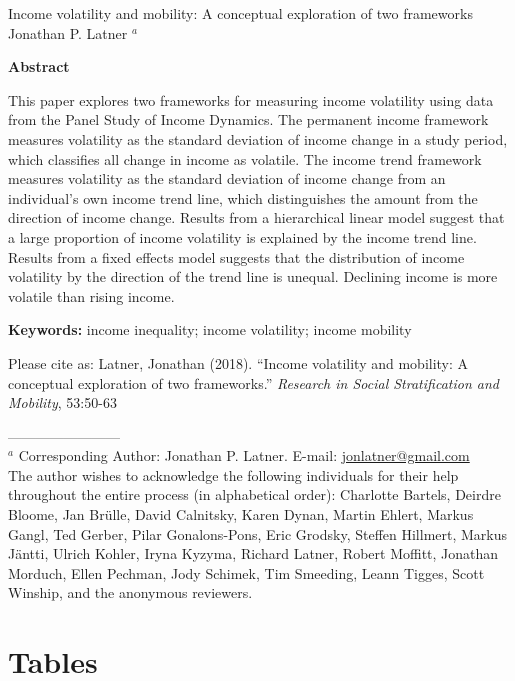 \documentclass[12pt]{article}
\begin{document}
\begin{center}
\large Income volatility and mobility: A conceptual exploration of two frameworks \\
\bigskip
\normalsize
Jonathan P. Latner $^{a}$\\
\end{center}

{\bf  Abstract}

This paper explores two frameworks for measuring income volatility using data from the Panel Study of Income Dynamics. The permanent income framework measures volatility as the standard deviation of income change in a study period, which classifies all change in income as volatile. The income trend framework measures volatility as the standard deviation of income change from an individual's own income trend line, which distinguishes the amount from the direction of income change. Results from a hierarchical linear model suggest that a large proportion of income volatility is explained by the income trend line. Results from a fixed effects model suggests that the distribution of income volatility by the direction of the trend line is unequal. Declining income is more volatile than rising income. 

{\bf  Keywords:} income inequality; income volatility; income mobility

Please cite as: Latner, Jonathan (2018).  ``Income volatility and mobility: A conceptual exploration of two frameworks.'' \emph{Research in Social Stratification and Mobility}, 53:50-63

\vfill

------------------------ \\
\footnotesize
$^{a}$ Corresponding Author: Jonathan P. Latner.  E-mail:  \url{jonlatner@gmail.com}\\
The author wishes to acknowledge the following individuals for their help throughout the entire process (in alphabetical order):  Charlotte Bartels, Deirdre Bloome, Jan Br{\"u}lle, David Calnitsky, Karen Dynan, Martin Ehlert, Markus Gangl, Ted Gerber, Pilar Gonalons-Pons, Eric Grodsky, Steffen Hillmert, Markus J{\"a}ntti, Ulrich Kohler, Iryna Kyzyma, Richard Latner, Robert Moffitt, Jonathan Morduch, Ellen Pechman, Jody Schimek, Tim Smeeding, Leann Tigges, Scott Winship, and the anonymous reviewers.

\clearpage
\section{Tables}
\end{document}

